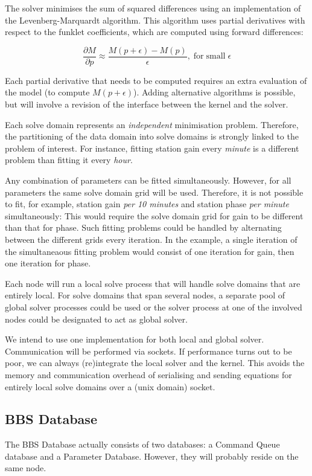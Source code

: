 \documentclass[10pt]{lofar}
\begin{document}
The solver minimises the sum of squared differences using an implementation of
the Levenberg-Marquardt algorithm. This algorithm uses partial derivatives with
respect to the funklet coefficients, which are computed using forward
differences:

\[
\frac{\partial M}{\partial p} \approx \frac{M(p + \epsilon) -
M(p)}{\epsilon}\mathrm{,}\;\mathrm{for}\;\mathrm{small}\;\epsilon
\]

Each partial derivative that needs to be computed requires an extra evaluation
of the model (to compute $M(p + \epsilon)$). Adding alternative algorithms is
possible, but will involve a revision of the interface between the kernel and
the solver.

Each solve domain represents an \emph{independent} minimisation problem.
Therefore, the partitioning of the data domain into solve domains is strongly
linked to the problem of interest. For instance, fitting station gain every
\emph{minute} is a different problem than fitting it every \emph{hour}.

Any combination of parameters can be fitted simultaneously. However, for all
parameters the same solve domain grid will be used. Therefore, it is not
possible to fit, for example, station gain \emph{per 10 minutes} and station
phase \emph{per minute} simultaneously: This would require the solve domain grid
for gain to be different than that for phase. Such fitting problems could be
handled by alternating between the different grids every iteration. In the
example, a single iteration of the simultaneaous fitting problem would consist
of one iteration for gain, then one iteration for phase.

Each node will run a local solve process that will handle solve domains that are
entirely local. For solve domains that span several nodes, a separate pool of
global solver processes could be used or the solver process at one of the
involved nodes could be designated to act as global solver.

We intend to use one implementation for both local and global solver.
Communication will be performed via sockets. If performance turns out to be
poor, we can always (re)integrate the local solver and the kernel. This avoids
the memory and communication overhead of serialising and sending equations for
entirely local solve domains over a (unix domain) socket.

\subsection{BBS Database}
\label{subsec:design-database}
The BBS Database actually consists of two databases: a Command Queue database
and a Parameter Database. However, they will probably reside on the same node.
\end{document}
